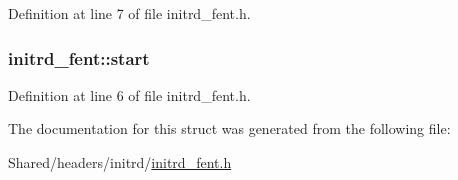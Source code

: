 Definition at line 7 of file initrd\_\-fent.h.

\hypertarget{structinitrd__fent_a0585ff6c63fa0021b21046644256f213}{
\subsubsection[{start}]{ {\bf initrd\_\-fent::start}}}
\label{structinitrd__fent_a0585ff6c63fa0021b21046644256f213}


Definition at line 6 of file initrd\_\-fent.h.



The documentation for this struct was generated from the following file:\begin{DoxyCompactItemize}
\item 
Shared/headers/initrd/\hyperlink{initrd__fent_8h}{initrd\_\-fent.h}\end{DoxyCompactItemize}
